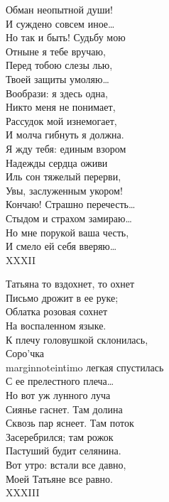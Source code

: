{Обман неопытной души!\\
И суждено совсем иное…\\
Но так и быть! Судьбу мою\\
Отныне я тебе вручаю,\\
Перед тобою слезы лью,\\
Твоей защиты умоляю…\\
Вообрази: я здесь одна,\\
Никто меня не понимает,\\
Рассудок мой изнемогает,\\
И молча гибнуть я должна.\\
Я жду тебя: единым взором\\
Надежды сердца оживи\\
Иль сон тяжелый перерви,\\
Увы, заслуженным укором!\\
Кончаю! Страшно перечесть…\\
Стыдом и страхом замираю…\\
Но мне порукой ваша честь,\\
И смело ей себя вверяю…\\

XXXII

Татьяна то вздохнет, то охнет\\
Письмо дрожит в ее руке;\\
Облатка розовая сохнет\\
На воспаленном языке.\\
К плечу головушкой склонилась,\\
Соро'чка\\marginnote{intimo} легкая спустилась\\
С ее прелестного плеча…\\
Но вот уж лунного луча\\
Сиянье гаснет. Там долина\\
Сквозь пар яснеет. Там поток\\
Засеребрился; там рожок\\
Пастуший будит селянина.\\
Вот утро: встали все давно,\\
Моей Татьяне все равно.\\

XXXIII

}
